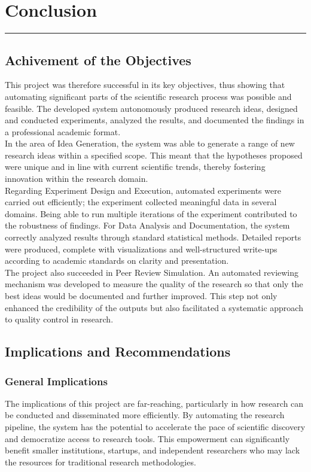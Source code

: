 \chapter{Conclusion}
\vspace{-1.5cm}
\hspace{-1cm}\rule{19cm}{0.4pt} 

\section{Achivement of the Objectives}
This project was therefore successful in its key objectives, thus showing that automating significant parts of the scientific research process was possible and feasible. The developed system autonomously produced research ideas, designed and conducted experiments, analyzed the results, and documented the findings in a professional academic format.\\
In the area of Idea Generation, the system was able to generate a range of new research ideas within a specified scope. This meant that the hypotheses proposed were unique and in line with current scientific trends, thereby fostering innovation within the research domain.\\
Regarding Experiment Design and Execution, automated experiments were carried out efficiently; the experiment collected meaningful data in several domains. Being able to run multiple iterations of the experiment contributed to the robustness of findings. For Data Analysis and Documentation, the system correctly analyzed results through standard statistical methods. Detailed reports were produced, complete with visualizations and well-structured write-ups according to academic standards on clarity and presentation.\\
The project also succeeded in Peer Review Simulation. An automated reviewing mechanism was developed to measure the quality of the research so that only the best ideas would be documented and further improved. This step not only enhanced the credibility of the outputs but also facilitated a systematic approach to quality control in research.

\section{Implications and Recommendations}
\subsection{General Implications}
The implications of this project are far-reaching, particularly in how research can be conducted and disseminated more efficiently. By automating the research pipeline, the system has the potential to accelerate the pace of scientific discovery and democratize access to research tools. This empowerment can significantly benefit smaller institutions, startups, and independent researchers who may lack the resources for traditional research methodologies.

